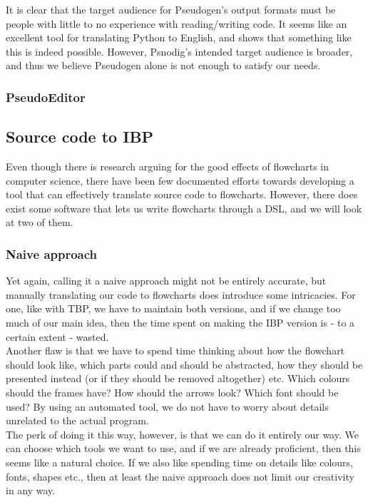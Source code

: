 It is clear that the target audience for Pseudogen's output formats must be people with little to no experience with reading/writing code. It seems like an excellent tool for translating Python to English, and shows that something like this is indeed possible. However, Psnodig's intended target audience is broader, and thus we believe Pseudogen alone is not enough to satisfy our needs.

\subsubsection{PseudoEditor}



\subsection{Source code to IBP}

Even though there is research arguing for the good effects of flowcharts in computer science, there have been few documented efforts towards developing a tool that can effectively translate source code to flowcharts. However, there does exist some software that lets us write flowcharts through a DSL, and we will look at two of them.

\subsubsection{Naive approach}

Yet again, calling it a naive approach might not be entirely accurate, but manually translating our code to flowcharts does introduce some intricacies. For one, like with TBP, we have to maintain both versions, and if we change too much of our main idea, then the time spent on making the IBP version is - to a certain extent - wasted. \\

Another flaw is that we have to spend time thinking about how the flowchart should look like, which parts could and should be abstracted, how they should be presented instead (or if they should be removed altogether) etc. Which colours should the frames have? How should the arrows look? Which font should be used? By using an automated tool, we do not have to worry about details unrelated to the actual program. \\

The perk of doing it this way, however, is that we can do it entirely our way. We can choose which tools we want to use, and if we are already proficient, then this seems like a natural choice. If we also like spending time on details like colours, fonts, shapes etc., then at least the naive approach does not limit our creativity in any way. \\

